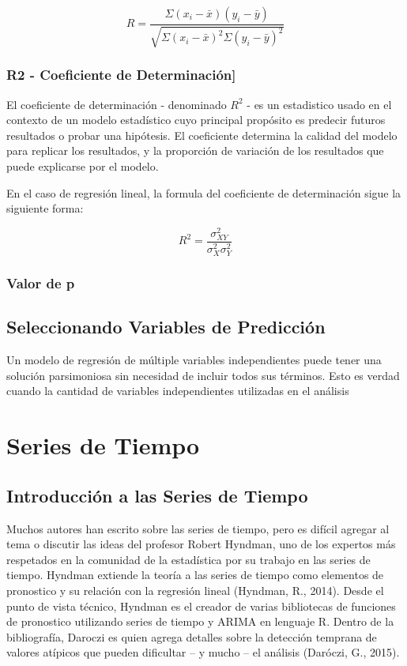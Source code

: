 \documentclass[letterpaper, spanish, 11pt]{report}
\begin{document}
\[R = \frac{\Sigma(x_i - \bar{x})(y_i - \bar{y})}{\sqrt{\Sigma(x_i - \bar{x})^2\Sigma(y_i - \bar{y})^2}}\]

\subsubsection{R2 - Coeficiente de Determinación]}
El coeficiente de determinación - denominado \(R^{2}\) - es un estadistico usado en el contexto de un modelo estadístico cuyo principal propósito es predecir futuros resultados o probar una hipótesis. El coeficiente determina la calidad del modelo para replicar los resultados, y la proporción de variación de los resultados que puede explicarse por el modelo. 

En el caso de regresión lineal, la formula del coeficiente de determinación sigue la siguiente forma:

\[R^{2} = \frac{\sigma^{2}_{XY}}{\sigma^{2}_{X}\sigma^{2}_{Y}}\]

\subsubsection{Valor de p}

\subsection{Seleccionando Variables de Predicción}
Un modelo de regresión de múltiple variables independientes puede tener una solución parsimoniosa sin necesidad de incluir todos sus términos. Esto es verdad cuando la cantidad de variables independientes utilizadas en el análisis 

\section{Series de Tiempo}

\subsection{Introducción a las Series de Tiempo}
Muchos autores han escrito sobre las series de tiempo, pero es difícil agregar al tema o discutir las ideas del profesor Robert Hyndman, uno de los expertos más respetados en la comunidad de la estadística por su trabajo en las series de tiempo. Hyndman extiende la teoría a las series de tiempo como elementos de pronostico y su relación con la regresión lineal (Hyndman, R., 2014). Desde el punto de vista técnico, Hyndman es el creador de varias bibliotecas de funciones de pronostico utilizando series de tiempo y ARIMA en lenguaje R. Dentro de la bibliografía, Daroczi es quien agrega detalles sobre la detección temprana de valores atípicos que pueden dificultar – y mucho – el análisis (Daróczi, G., 2015). 
\end{document}

